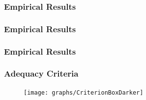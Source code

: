 \begin{frame}%
  \frametitle{Empirical Results}
  \framesubtitle{\mbox{}}
  \begin{center}


\end{center}
\end{frame}

\begin{frame}%
  \frametitle{Empirical Results}
  \framesubtitle{\mbox{}}
  \begin{center}


\end{center}
\end{frame}

\begin{frame}%
  \frametitle{Empirical Results}
  \framesubtitle{\mbox{}}
  \begin{center}


\end{center}
\end{frame}

% 
% 

\begin{frame}%
  \frametitle{Adequacy Criteria}
  \framesubtitle{\mbox{}}
  \vspace*{-.1in}
  \begin{figure}
    \texttt{[image: graphs/CriterionBoxDarker]}
  \end{figure}

  
  \vspace{-.075in}

  \begin{figure}
    \begin{centering}
    \end{centering}
  \end{figure}

\end{frame}

